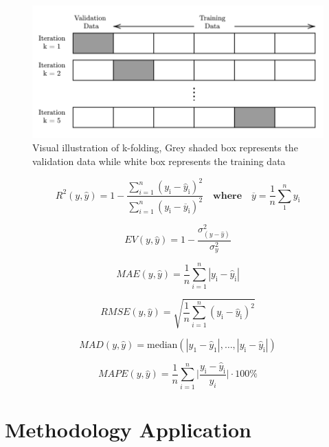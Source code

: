 \documentclass[]{interact}
\theoremstyle{plain}%
\theoremstyle{definition}
\theoremstyle{remark}
\begin{document}
\begin{figure}
  \centering
  \includegraphics[width=.65\textwidth]{00_figures/kfold.png}
  \caption{Visual illustration of k-folding, Grey shaded box represents the validation data while white box represents the training data}
  \label{fig:kfold}
\end{figure}

\begin{equation}\label{eqn:rsquared}
  R^2(y,\hat{y}) = 1 - \frac{\sum_{i = 1}^{n} (y_{\text{i}} - \hat{y}_{\text{i}} )^2 }{\sum_{i = 1}^{n} (y_{\text{i}} - \overline{y}_{\text{i}})^2} \quad \textbf{where} \quad \overline{y} = \frac{1}{n}\sum_{1}^{n} y_\text{i}
\end{equation}

\begin{equation}\label{eqn:expVar}
  EV(y,\hat{y}) = 1 - \frac{\sigma^2_{(y-\hat{y})}}{\sigma^2_{y}}
\end{equation}

\begin{equation}\label{eqn:MAE}
  MAE(y,\hat{y}) = \frac{1}{n}\sum_{i=1}^{n} |y_{\text{i}} - \hat{y}_{\text{i}}| 
\end{equation}

\begin{equation}\label{eqn:RMSE}
  RMSE(y,\hat{y}) = \sqrt{\frac{1}{n}\sum_{i=1}^{n} (y_{\text{i}} - \hat{y}_{\text{i}})^2} 
\end{equation}

\begin{equation}\label{eqn:MAD}
  MAD(y,\hat{y}) =  \text{median} (|y_{\text{1}} - \hat{y}_{\text{1}}|,\dots,|y_{\text{i}} - \hat{y}_{\text{i}}|)
\end{equation}

\begin{equation}\label{eqn:MAPE}
  MAPE(y,\hat{y}) = \frac{1}{n}\sum_{i=1}^{n} \biggl|\frac{y_{\text{i}} - \hat{y}_{\text{i}}}{y_i}\biggr| \cdot 100\% 
\end{equation}

\section{Methodology Application}\label{sec:method_apply}
\end{document}
